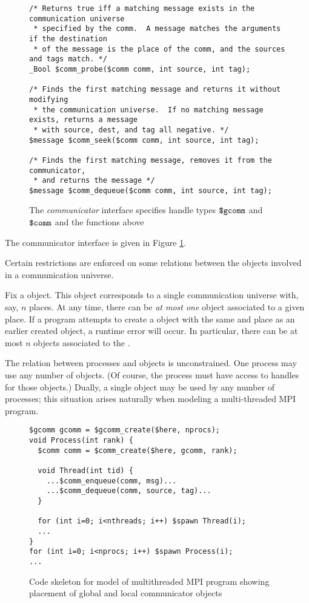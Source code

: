 \begin{figure}
\begin{small}
\begin{verbatim}
/* Returns true iff a matching message exists in the communication universe
 * specified by the comm.  A message matches the arguments if the destination
 * of the message is the place of the comm, and the sources and tags match. */
_Bool $comm_probe($comm comm, int source, int tag);

/* Finds the first matching message and returns it without modifying
 * the communication universe.  If no matching message exists, returns a message
 * with source, dest, and tag all negative. */
$message $comm_seek($comm comm, int source, int tag);

/* Finds the first matching message, removes it from the communicator,
 * and returns the message */ 
$message $comm_dequeue($comm comm, int source, int tag);
\end{verbatim}
  \end{small}
  \caption{The \emph{communicator} interface specifies handle 
    types $\mbox{\texttt{\${}gcomm}}$ and $\mbox{\texttt{\${}comm}}$ and the functions above}
  \label{fig:comm}
\end{figure}

The communicator interface is given in Figure \ref{fig:comm}.

Certain restrictions are enforced on some relations between the
objects involved in a communication universe.

Fix a \cgcomm{} object.  This object corresponds to a single
communication universe with, say, $n$ places.  At any time, there can
be \emph{at most one} \ccomm{} object associated to a given place.  If
a program attempts to create a \ccomm{} object with the same \cgcomm{}
and place as an earlier created \ccomm{} object, a runtime error will
occur.  In particular, there can be at most $n$ \ccomm{} objects
associated to the \cgcomm.

The relation between processes and \ccomm{} objects is unconstrained.
One process may use any number of \ccomm{} objects.  (Of course, the
process must have access to handles for those \ccomm{} objects.)
Dually, a single \ccomm{} object may be used by any number of
processes; this situation arises naturally when modeling a
multi-threaded MPI program.

\begin{figure}
  \begin{small}
\begin{verbatim}
$gcomm gcomm = $gcomm_create($here, nprocs);
void Process(int rank) {
  $comm comm = $comm_create($here, gcomm, rank);

  void Thread(int tid) {
    ...$comm_enqueue(comm, msg)...
    ...$comm_dequeue(comm, source, tag)...
  }

  for (int i=0; i<nthreads; i++) $spawn Thread(i);
  ...
}
for (int i=0; i<nprocs; i++) $spawn Process(i);
...
\end{verbatim}
  \end{small}
  \caption{Code skeleton for model of multithreaded MPI program
    showing placement of global and local communicator objects}
  \label{fig:mpi-threads-comm}
\end{figure}

